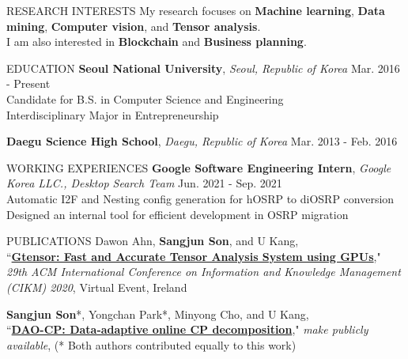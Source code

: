 \documentclass[12pt]{resume} %
\begin{document}


\begin{rSection}{RESEARCH INTERESTS}
My research focuses on \textbf{Machine learning}, \textbf{Data mining}, \textbf{Computer vision}, and \textbf{Tensor analysis}. \\
I am also interested in \textbf{Blockchain} and \textbf{Business planning}.

\end{rSection}
%
\begin{rSection}{EDUCATION}
{\bf Seoul National University}, \textit{Seoul, Republic of Korea} \hfill Mar. 2016 - Present \\
Candidate for B.S. in Computer Science and Engineering \\
Interdisciplinary Major in Entrepreneurship

{\bf Daegu Science High School}, \textit{Daegu, Republic of Korea} \hfill Mar. 2013 - Feb. 2016
\end{rSection}

\begin{rSection}{WORKING EXPERIENCES}
{\bf Google Software Engineering Intern}, \textit{Google Korea LLC., Desktop Search Team} \hfill Jun. 2021 - Sep. 2021 \\ 
Automatic I2F and Nesting config generation for hOSRP to diOSRP conversion \\
Designed an internal tool for efficient development in OSRP migration
\end{rSection}

\begin{rSection}{PUBLICATIONS}
Dawon Ahn, \textbf{Sangjun Son}, and U Kang, \\
	``\href{https://dl.acm.org/doi/abs/10.1145/3340531.3417413}
	{\textbf{Gtensor: Fast and Accurate Tensor Analysis System using GPUs}}," \\
	\textit{29th ACM International Conference on 
	Information and Knowledge Management (CIKM) 2020}, Virtual Event, Ireland
	
\textbf{Sangjun Son}*, Yongchan Park*, Minyong Cho, and U Kang, \\ 
	``\href{https://datalab.snu.ac.kr/dao-cp/}
	{\textbf{DAO-CP: Data-adaptive online CP decomposition}}," 
    \textit{make publicly available}, (* Both authors contributed equally to this work)
\end{rSection}
\end{document}

